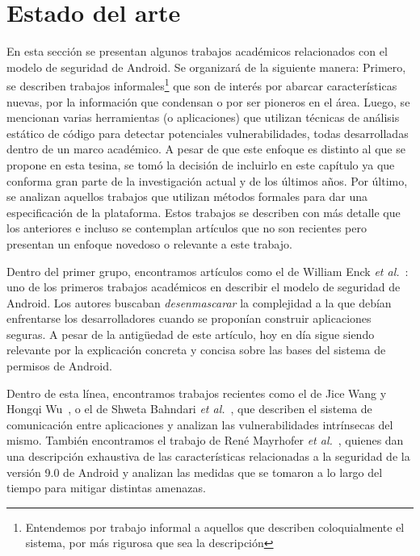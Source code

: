 
\chapter*{Estado del arte}
\label{chapter:estado}

En esta sección se presentan algunos trabajos académicos relacionados con el
modelo de seguridad de Android. Se organizará de la siguiente manera: Primero,
se describen trabajos informales\footnote{Entendemos por trabajo informal a
aquellos que describen coloquialmente el sistema, por más rigurosa que sea la
descripción} que son de interés por abarcar características nuevas, por la
información que condensan o por ser pioneros en el área. Luego, se mencionan
varias herramientas (o aplicaciones) que utilizan técnicas de análisis estático
de código para detectar potenciales vulnerabilidades, todas desarrolladas dentro
de un marco académico. A pesar de que este enfoque  es distinto al que se
propone en esta tesina, se tomó la decisión de incluirlo en este capítulo ya que
conforma gran parte de la investigación actual y de los últimos años. Por
último, se analizan aquellos trabajos que utilizan métodos formales para dar una
especificación de la plataforma. Estos trabajos se describen con más detalle que
los anteriores e incluso se contemplan artículos que no son recientes pero
presentan un enfoque novedoso o relevante a este trabajo.

Dentro del primer grupo, encontramos artículos como el de William Enck
\textit{et al.}~\cite{enck}: uno de los primeros trabajos académicos en
describir el modelo de seguridad de Android. Los autores buscaban
\textit{desenmascarar} la complejidad a la que debían enfrentarse los
desarrolladores cuando se proponían construir aplicaciones seguras. A pesar de
la antigüedad de este artículo, hoy en día sigue siendo relevante por la
explicación concreta y concisa sobre las bases del sistema de permisos de
Android.

Dentro de esta línea, encontramos trabajos recientes como el de Jice Wang y
Hongqi Wu~\cite{wang}, o el de Shweta Bahndari \textit{et al.}~\cite{bhandari},
que describen el sistema de comunicación entre aplicaciones y analizan las
vulnerabilidades intrínsecas del mismo. También encontramos el trabajo de René
Mayrhofer \textit{et al.}~\cite{mayrhofer}, quienes dan una descripción
exhaustiva de las características relacionadas a la seguridad de la versión 9.0
de Android y analizan las medidas que se tomaron a lo largo del tiempo para
mitigar distintas amenazas.

